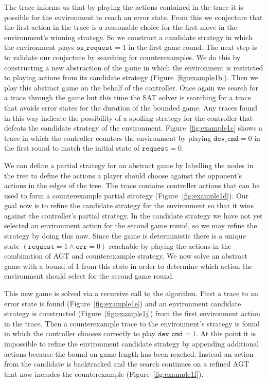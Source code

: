 The trace informs us that by playing the actions contained in the trace it is possible for the environment to reach an error state. From this we conjecture that the first action in the trace is a reasonable choice for the first move in the environment's winning strategy. So we construct a candidate strategy in which the environment plays $\texttt{os\_request} =1$ in the first game round. The next step is to validate our conjecture by searching for counterexamples. We do this by constructing a new abstraction of the game in which the environment is restricted to playing actions from its candidate strategy (Figure~\ref{fig:example1b}). Then we play this abstract game on the behalf of the controller. Once again we search for a trace through the game but this time the SAT solver is searching for a trace that avoids error states for the duration of the bounded game. Any traces found in this way indicate the possibility of a spoiling strategy for the controller that defeats the candidate strategy of the environment. Figure~\ref{fig:example1c} shows a trace in which the controller counters the environment by playing $\texttt{dev\_cmd} = 0$ in the first round to match the initial state of $\texttt{request} = 0$.

We can define a partial strategy for an abstract game by labelling the nodes in the tree to define the actions a player should choose against the opponent's actions in the edges of the tree. The trace contains controller actions that can be used to form a counterexample partial strategy (Figure~\ref{fig:example1d}).  Our goal now is to refine the candidate strategy for the environment so that it wins against the controller's partial strategy. In the candidate strategy we have not yet selected an environment action for the second game round, so we may refine the strategy by doing this now. Since the game is deterministic there is a unique state $(\texttt{request} = 1 \land \texttt{err} = 0)$ reachable by playing the actions in the combination of AGT and counterexample strategy.  We now solve an abstract game with a bound of 1 from this state in order to determine which action the environment should select for the second game round. 

This new game is solved via a recursive call to the algorithm. First a trace to an error state is found (Figure~\ref{fig:example1e}) and an environment candidate strategy is constructed (Figure~\ref{fig:example1j}) from the first environment action in the trace. Then a counterexample trace to the environment's strategy is found in which the controller chooses correctly to play $\texttt{dev\_cmd} = 1$.  At this point it is impossible to refine the environment candidate strategy by appending additional actions because the bound on game length has been reached. Instead an action from the candidate is backtracked and the search continues on a refined AGT that now includes the counterexample (Figure~\ref{fig:example1f}).


